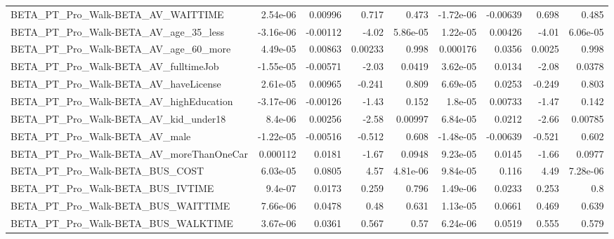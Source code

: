 \begin{tabular}{lrrrrrrrr}
BETA\_PT\_Pro\_Walk-BETA\_AV\_WAITTIME                  &    2.54e-06 &      0.00996 &    0.717 &    0.473 &  -1.72e-06 &    -0.00639 &        0.698 &         0.485 \\
BETA\_PT\_Pro\_Walk-BETA\_AV\_age\_35\_less               &   -3.16e-06 &     -0.00112 &    -4.02 & 5.86e-05 &   1.22e-05 &     0.00426 &        -4.01 &      6.06e-05 \\
BETA\_PT\_Pro\_Walk-BETA\_AV\_age\_60\_more               &    4.49e-05 &      0.00863 &  0.00233 &    0.998 &   0.000176 &      0.0356 &       0.0025 &         0.998 \\
BETA\_PT\_Pro\_Walk-BETA\_AV\_fulltimeJob               &   -1.55e-05 &     -0.00571 &    -2.03 &   0.0419 &   3.62e-05 &      0.0134 &        -2.08 &        0.0378 \\
BETA\_PT\_Pro\_Walk-BETA\_AV\_haveLicense               &    2.61e-05 &      0.00965 &   -0.241 &    0.809 &   6.69e-05 &      0.0253 &       -0.249 &         0.803 \\
BETA\_PT\_Pro\_Walk-BETA\_AV\_highEducation             &   -3.17e-06 &     -0.00126 &    -1.43 &    0.152 &    1.8e-05 &     0.00733 &        -1.47 &         0.142 \\
BETA\_PT\_Pro\_Walk-BETA\_AV\_kid\_under18               &     8.4e-06 &      0.00256 &    -2.58 &  0.00997 &   6.84e-05 &      0.0212 &        -2.66 &       0.00785 \\
BETA\_PT\_Pro\_Walk-BETA\_AV\_male                      &   -1.22e-05 &     -0.00516 &   -0.512 &    0.608 &  -1.48e-05 &    -0.00639 &       -0.521 &         0.602 \\
BETA\_PT\_Pro\_Walk-BETA\_AV\_moreThanOneCar            &    0.000112 &       0.0181 &    -1.67 &   0.0948 &   9.23e-05 &      0.0145 &        -1.66 &        0.0977 \\
BETA\_PT\_Pro\_Walk-BETA\_BUS\_COST                     &    6.03e-05 &       0.0805 &     4.57 & 4.81e-06 &   9.84e-05 &       0.116 &         4.49 &      7.28e-06 \\
BETA\_PT\_Pro\_Walk-BETA\_BUS\_IVTIME                   &     9.4e-07 &       0.0173 &    0.259 &    0.796 &   1.49e-06 &      0.0233 &        0.253 &           0.8 \\
BETA\_PT\_Pro\_Walk-BETA\_BUS\_WAITTIME                 &    7.66e-06 &       0.0478 &     0.48 &    0.631 &   1.13e-05 &      0.0661 &        0.469 &         0.639 \\
BETA\_PT\_Pro\_Walk-BETA\_BUS\_WALKTIME                 &    3.67e-06 &       0.0361 &    0.567 &     0.57 &   6.24e-06 &      0.0519 &        0.555 &         0.579 \\

\end{tabular}

